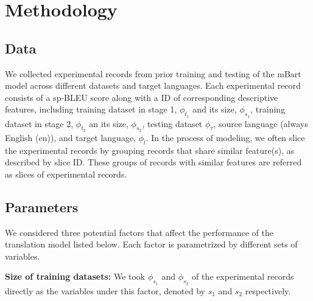 \documentclass[11pt]{article}
\begin{document}
\section{Methodology}

\subsection{Data}
We collected experimental records from prior training and testing of the mBart model across different datasets and target languages. Each experimental record consists of a sp-BLEU score along with a ID of corresponding descriptive features, including training dataset in stage 1, $\phi_{t_1}$ and its size, $\phi_{s_1}$, training dataset in stage 2, $\phi_{t_2}$ an its size, $\phi_{s_2}$, testing dataset $\phi_{\tau}$, source language (always English (en)), and target language, $\phi_{l}$. 
 In the process of modeling, we often slice the experimental records by grouping records that share similar feature(s), as described by slice ID. These groups of records with similar features are referred as slices of experimental records.

\subsection{Parameters}
We considered three potential factors that affect the performance of the translation model listed below. Each factor is parametrized by different sets of variables.

\textbf{Size of training datasets:} We took $\phi_{s_1}$ and $\phi_{s_2}$ of the experimental records directly as the variables under this factor, denoted by $s_1$ and $s_2$ respectively.
\end{document}
